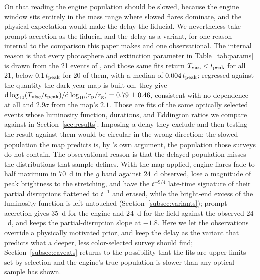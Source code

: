 \documentclass[twocolumn,pdftex]{aastex701}
\begin{document}
On that reading the engine population should be slowed, because the engine window sits entirely in the mass range where slowed flares dominate, and the physical expectation would make the delay the fiducial. We nevertheless take prompt accretion as the fiducial and the delay as a variant, for one reason internal to the comparison this paper makes and one observational. The internal reason is that every photosphere and extinction parameter in Table~\ref{tab:params} is drawn from the 21 events of \citet{Nicholl:2022a}, and those same fits return $T_{\rm visc} < t_{\rm peak}$ for all 21, below $0.1\, t_{\rm peak}$ for 20 of them, with a median of $0.004\, t_{\rm peak}$; regressed against the quantity the dark-year map is built on, they give ${\rm d}\log_{10}(T_{\rm visc}/t_{\rm peak})/{\rm d}\log_{10}(r_{\rm p}/r_{\rm g}) = 0.79 \pm 0.46$, consistent with no dependence at all and $2.9\sigma$ from the map's $2.1$. Those are fits of the same optically selected events whose luminosity function, durations, and Eddington ratios we compare against in Section~\ref{sec:results}. Imposing a delay they exclude and then testing the result against them would be circular in the wrong direction: the slowed population the map predicts is, by \citeauthor{Guillochon:2015a}'s own argument, the population those surveys do not contain. The observational reason is that the delayed population misses the distributions that sample defines. With the map applied, engine flares fade to half maximum in $70$~d in the $g$ band against $24$~d observed, lose a magnitude of peak brightness to the stretching, and have the $t^{-9/4}$ late-time signature of their partial disruptions flattened to $t^{-1}$ and erased, while the bright-end excess of the luminosity function is left untouched (Section~\ref{subsec:variants}); prompt accretion gives $35$~d for the engine and $24$~d for the field against the observed $24$~d, and keeps the partial-disruption slope at $-1.8$. Here we let the observations override a physically motivated prior, and keep the delay as the variant that predicts what a deeper, less color-selected survey should find; Section~\ref{subsec:caveats} returns to the possibility that the fits are upper limits set by selection and the engine's true population is slower than any optical sample has shown.
\end{document}
